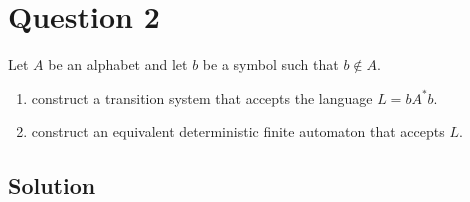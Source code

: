 
\section*{Question 2}

Let $A$ be an alphabet and let $b$ be a symbol such that $b \notin A$.

\begin{enumerate}[label=(\alph*)]
	\item construct a transition system that accepts the language $ L = b A^* b $.
	\item construct an equivalent deterministic finite automaton that accepts $L$.
\end{enumerate}

\subsection*{Solution}

